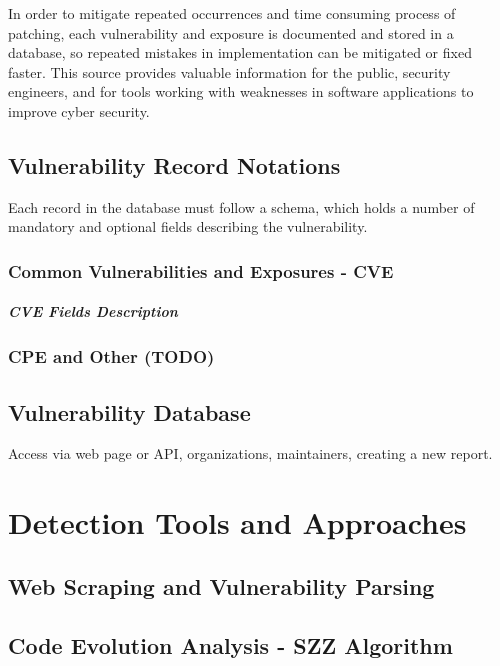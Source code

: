 
  In order to mitigate repeated occurrences and time consuming process of patching, each
  vulnerability and exposure is documented and stored in a database, so repeated mistakes in implementation
  can be mitigated or fixed faster. This source provides valuable information for the public,
  security engineers, and for tools working with weaknesses in software applications to improve
  cyber security.

  \section{Vulnerability Record Notations}
    Each record in the database must follow a schema, which holds a number of mandatory and optional fields
    describing the vulnerability.
    \subsection*{Common Vulnerabilities and Exposures - CVE}
      \paragraph{CVE Fields Description}
    \subsection*{CPE and Other (TODO)}

  \section{Vulnerability Database}
    Access via web page or API, organizations, maintainers, creating a new report.

\newpage


\chapter{Detection Tools and Approaches}

  \section{Web Scraping and Vulnerability Parsing}

  \section{Code Evolution Analysis - SZZ Algorithm}

